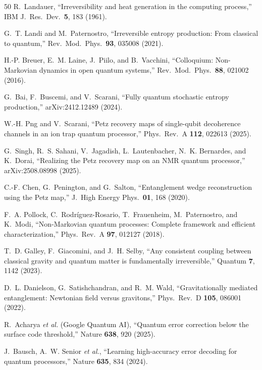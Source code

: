 \documentclass[12pt]{article}
\theoremstyle{definition}
\theoremstyle{remark}
\begin{document}
\begin{thebibliography}{50}
R.~Landauer,
``Irreversibility and heat generation in the computing process,''
IBM J.\ Res.\ Dev.\ \textbf{5}, 183 (1961).

G.~T. Landi and M.~Paternostro,
``Irreversible entropy production: From classical to quantum,''
Rev.\ Mod.\ Phys.\ \textbf{93}, 035008 (2021).

H.-P. Breuer, E.~M. Laine, J.~Piilo, and B.~Vacchini,
``Colloquium: Non-Markovian dynamics in open quantum systems,''
Rev.\ Mod.\ Phys.\ \textbf{88}, 021002 (2016).

G.~Bai, F.~Buscemi, and V.~Scarani,
``Fully quantum stochastic entropy production,''
arXiv:2412.12489 (2024).

W.-H. Png and V.~Scarani,
``Petz recovery maps of single-qubit decoherence channels in an
ion trap quantum processor,''
Phys.\ Rev.\ A \textbf{112}, 022613 (2025).

G.~Singh, R.~S. Sahani, V.~Jagadish, L.~Lautenbacher,
N.~K. Bernardes, and K.~Dorai,
``Realizing the Petz recovery map on an NMR quantum processor,''
arXiv:2508.08998 (2025).

C.-F. Chen, G.~Penington, and G.~Salton,
``Entanglement wedge reconstruction using the Petz map,''
J.\ High Energy Phys.\ \textbf{01}, 168 (2020).

F.~A. Pollock, C.~Rodr\'iguez-Rosario, T.~Frauenheim,
M.~Paternostro, and K.~Modi,
``Non-Markovian quantum processes: Complete framework and efficient
characterization,''
Phys.\ Rev.\ A \textbf{97}, 012127 (2018).

T.~D. Galley, F.~Giacomini, and J.~H. Selby,
``Any consistent coupling between classical gravity and quantum
matter is fundamentally irreversible,''
Quantum \textbf{7}, 1142 (2023).

D.~L. Danielson, G.~Satishchandran, and R.~M. Wald,
``Gravitationally mediated entanglement: Newtonian field versus
gravitons,''
Phys.\ Rev.\ D \textbf{105}, 086001 (2022).

R.~Acharya \emph{et al.} (Google Quantum AI),
``Quantum error correction below the surface code threshold,''
Nature \textbf{638}, 920 (2025).

J.~Bausch, A.~W. Senior \emph{et al.},
``Learning high-accuracy error decoding for quantum processors,''
Nature \textbf{635}, 834 (2024).


\end{thebibliography}
\end{document}

